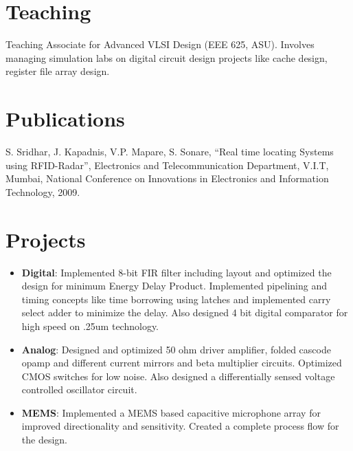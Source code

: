 \documentclass[margin]{res}
\begin{document}
\begin{resume}
\section{Teaching}
Teaching Associate for Advanced VLSI Design (EEE 625, ASU). Involves managing simulation labs on digital circuit design projects like cache design, register file array design.
\section{Publications}
S. Sridhar, J. Kapadnis, V.P. Mapare, S. Sonare, ``Real time locating Systems using RFID-Radar'', Electronics and Telecommunication Department, V.I.T, Mumbai, National Conference on Innovations in Electronics and Information Technology, 2009.

\section{Projects}
\begin{itemize}
\item
{\bf Digital}:  Implemented 8-bit FIR filter including layout and optimized the design for minimum Energy Delay Product. Implemented pipelining and timing concepts like time borrowing using latches and implemented carry select adder to minimize the delay. Also designed 4 bit digital comparator for high speed on .25um technology.
\item
{\bf Analog}: Designed and optimized 50 ohm driver amplifier, folded cascode opamp and different current mirrors and beta multiplier circuits. Optimized CMOS switches for low noise. Also designed a differentially sensed voltage controlled oscillator circuit.
\item
{\bf MEMS}: Implemented a MEMS based capacitive microphone array for improved directionality and sensitivity. Created a complete process flow for the design.
\end{itemize}


\end{resume}
\end{document}
